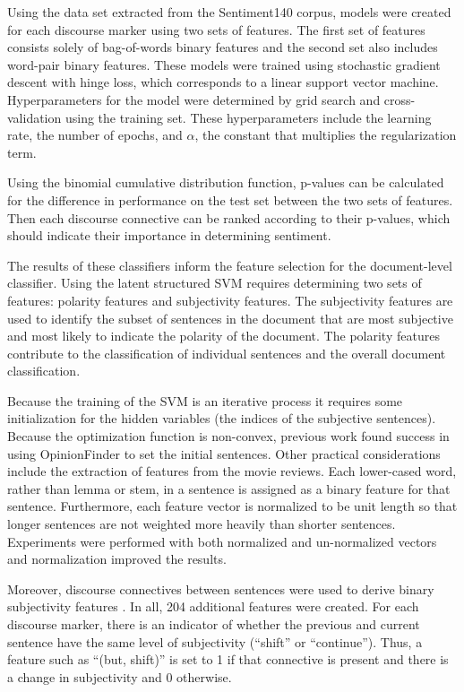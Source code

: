 \documentclass[11pt,letterpaper]{article}
\begin{document}

Using the data set extracted from the Sentiment140 corpus, models were created for each discourse marker using two sets of features.
The first set of features consists solely of bag-of-words binary features and the second set also includes word-pair binary features.
These models were trained using stochastic gradient descent with hinge loss, which corresponds to a linear support vector machine.
Hyperparameters for the model were determined by grid search and cross-validation using the training set.  These hyperparameters include the
learning rate, the number of epochs, and $\alpha$, the constant that multiplies the regularization term.

Using the binomial cumulative distribution function, p-values can be calculated for the difference in performance on the test set between the two sets
of features.  Then each discourse connective can be ranked according to their p-values, which should indicate their importance
in determining sentiment.

The results of these classifiers inform the feature selection for the document-level classifier.  Using the latent structured SVM
requires determining two sets of features: polarity features and subjectivity features.  The subjectivity features are used to identify
the subset of sentences in the document that are most subjective and most likely to indicate the polarity of the document.  The polarity
features contribute to the classification of individual sentences and the overall document classification.

Because the training of the SVM is an iterative process it requires some initialization for the hidden variables (the indices of the subjective sentences).
Because the optimization function is non-convex, previous work \cite {Yesselina} found success in using OpinionFinder \cite{Wilson} to set the initial sentences.
Other practical considerations include the extraction of features from the movie reviews.  Each lower-cased word, rather than lemma or stem, in a sentence is assigned as a binary feature
for that sentence.  Furthermore, each feature vector is normalized to be unit length so that longer sentences are not weighted more heavily than shorter sentences.
Experiments were performed with both normalized and un-normalized vectors and normalization improved the results.

Moreover, discourse connectives between sentences were used to derive binary subjectivity features \cite{Trivedi}.  In all, 204 additional features
were created.  For each discourse marker, there is an indicator of whether the previous and current sentence have the same level of subjectivity (``shift'' or ``continue'').
Thus, a feature such as ``(but, shift)'' is set to 1 if that connective is present and there is a change in subjectivity and 0 otherwise.
\end{document}
